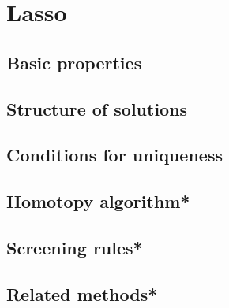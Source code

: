 \chapter{Lasso}
\label{chap:lasso}

\section{Basic properties}

\section{Structure of solutions}

\section{Conditions for uniqueness}

\section{Homotopy algorithm*}

\section{Screening rules*}

\section{Related methods*}